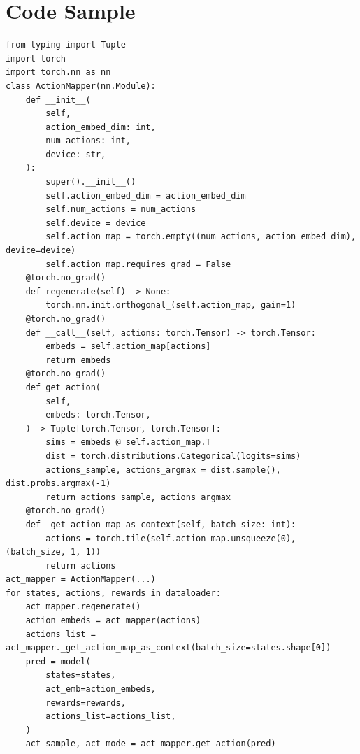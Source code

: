 \documentclass{article}
\theoremstyle{plain}
\theoremstyle{definition}
\theoremstyle{remark}
\begin{document}
\section{Code Sample}
\label{appendix:pseudo_code}
\begin{listing}[h!]
\begin{tcolorbox}[left*=1.5mm, size=fbox, colback=mygray, boxrule=0.1pt]
\begin{verbatim}
from typing import Tuple
import torch
import torch.nn as nn
class ActionMapper(nn.Module):
    def __init__(
        self,
        action_embed_dim: int,
        num_actions: int,
        device: str,
    ):
        super().__init__()
        self.action_embed_dim = action_embed_dim
        self.num_actions = num_actions
        self.device = device
        self.action_map = torch.empty((num_actions, action_embed_dim), device=device)
        self.action_map.requires_grad = False
    @torch.no_grad()
    def regenerate(self) -> None:
        torch.nn.init.orthogonal_(self.action_map, gain=1)
    @torch.no_grad()
    def __call__(self, actions: torch.Tensor) -> torch.Tensor:
        embeds = self.action_map[actions]
        return embeds
    @torch.no_grad()
    def get_action(
        self,
        embeds: torch.Tensor,
    ) -> Tuple[torch.Tensor, torch.Tensor]:
        sims = embeds @ self.action_map.T
        dist = torch.distributions.Categorical(logits=sims)
        actions_sample, actions_argmax = dist.sample(), dist.probs.argmax(-1)
        return actions_sample, actions_argmax
    @torch.no_grad()
    def _get_action_map_as_context(self, batch_size: int):
        actions = torch.tile(self.action_map.unsqueeze(0), (batch_size, 1, 1))
        return actions
act_mapper = ActionMapper(...)
for states, actions, rewards in dataloader:
    act_mapper.regenerate()
    action_embeds = act_mapper(actions)
    actions_list = act_mapper._get_action_map_as_context(batch_size=states.shape[0])
    pred = model(
        states=states,
        act_emb=action_embeds,
        rewards=rewards,
        actions_list=actions_list,
    )
    act_sample, act_mode = act_mapper.get_action(pred)
\end{verbatim}
\end{tcolorbox}
\label{fig:code_sample}
\caption{Code that demonstrates the Headless-AD training procedure. Note that this snippet is intended for illustration purposes only. The complete code can be found in Headless-AD's repository.}
\end{listing}
\end{document}
